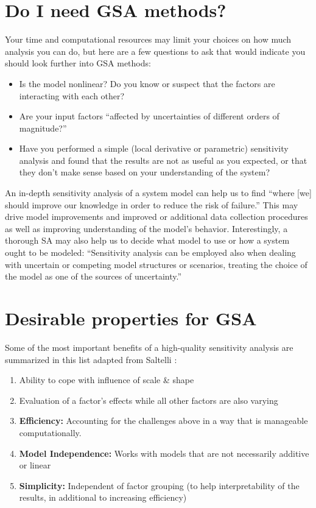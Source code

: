 \documentclass[10pt]{article}
\begin{document}
\section{Do I need GSA methods?}

Your time and computational resources may limit your choices on how much analysis you can do, but here are a few questions to ask that would indicate you should look further into GSA methods:

\vspace{-6}
\begin{itemize}
    \setlength{\itemsep}{0pt}%
    \setlength{\parskip}{0pt}%
    \item Is the model nonlinear? Do you know or suspect that the factors are interacting with each other?
    \item Are your input factors ``affected by uncertainties of different orders of magnitude?'' \cite{Saltelli2009-tz}
    \item Have you performed a simple (local derivative or parametric) sensitivity analysis and found that the results are not as useful as you expected, or that they don't make sense based on your understanding of the system?
\end{itemize}
\vspace{-6}

An in-depth sensitivity analysis of a system model can help us to find ``where [we] should improve our knowledge in order to reduce the risk of failure.'' \cite{Saltelli2004-ga} This may drive model improvements and improved or additional data collection procedures as well as improving understanding of the model's behavior. Interestingly, a thorough SA may also help us to decide what model to use or how a system ought to be modeled: ``Sensitivity analysis can be employed also when dealing with uncertain or competing model structures or scenarios, treating the choice of the model as one of the sources of uncertainty.'' \cite{Saltelli2000-jo}


\section{Desirable properties for GSA}

Some of the most important benefits of a high-quality sensitivity analysis are summarized in this list adapted from Saltelli \cite{Saltelli2009-tz}:

\begin{enumerate}
    \setlength{\itemsep}{0pt}%
    \setlength{\parskip}{0pt}%
    \item Ability to cope with influence of scale \& shape
    \item Evaluation of a factor's effects while all other factors are also varying
    \item \textbf{Efficiency:} Accounting for the challenges above in a way that is manageable computationally.
    \item \textbf{Model Independence:} Works with models that are not necessarily additive or linear
    \item \textbf{Simplicity:} Independent of factor grouping (to help interpretability of the results, in additional to increasing efficiency)
\end{enumerate}
\end{document}
